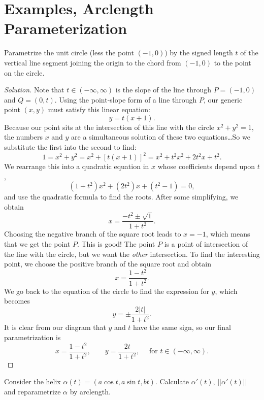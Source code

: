 \documentclass[Shifrin_Solutions_Spring_2018]{subfiles}
\begin{document}
\section{Examples, Arclength Parameterization}

\begin{exercise}
Parametrize the unit circle (less the point $(-1,0)$)  by the signed length $t$
of the vertical line segment joining the origin to the chord from $(-1,0)$ to
the point on the circle.
\end{exercise}

\begin{proof}[Solution]
Note that $t \in (-\infty, \infty)$ is the slope of the line through
$P = (-1,0)$ and $Q = (0,t)$. Using the point-slope form of a line through $P$,
our generic point $(x,y)$ must satisfy this linear equation:
\[
y = t ( x+1).
\]
Because our point sits at the intersection of this line with the circle
$x^2  + y^2 = 1$, the numbers $x$ and $y$ are a simultaneous
solution of these two equations\dots So we substitute the first into the second
to find:
\[
1 = x^2 + y^2 = x^2 + [t(x+1)]^2 = x^2 + t^2x^2 + 2t^2x + t^2.
\]
We rearrange this into a quadratic equation in $x$ whose coefficients depend
upon $t$,
\[
(1+t^2) x^2 + (2t^2) x + (t^2 - 1) = 0,
\]
and use the quadratic formula to find the roots. After some simplifying, we
obtain
\[
x = \dfrac{-t^2 \pm \sqrt{1}}{1+t^2}.
\]
Choosing the negative branch of the square root leads to $x=-1$, which means
that we get the point $P$. This is good! The point $P$ is a point of
intersection of the line with the circle, but we want the \emph{other}
intersection. To find the interesting point, we choose the positive
branch of the square root and obtain
\[
x = \dfrac{1-t^2}{1+t^2}.
\]
We go back to the equation of the circle to find the expression for $y$, which
becomes
\[
y =\pm \dfrac{ 2|t|}{1+t^2}.
\]
It is clear from our diagram that $y$ and $t$ have the same sign, so our final
parametrization is
\[
x = \dfrac{1-t^2}{1+t^2}, \qquad y = \dfrac{ 2t}{1+t^2}, \quad \mbox{ for } t
\in (-\infty, \infty) .
\]
\end{proof}

\clearpage


\begin{exercise}
Consider the helix $\alpha(t) = ( a \cos t , a \sin t , b t )$. Calculate
$\alpha'(t)$,
$||\alpha'(t)||$ and reparametrize $\alpha$ by arclength.
\end{exercise}
\end{document}
